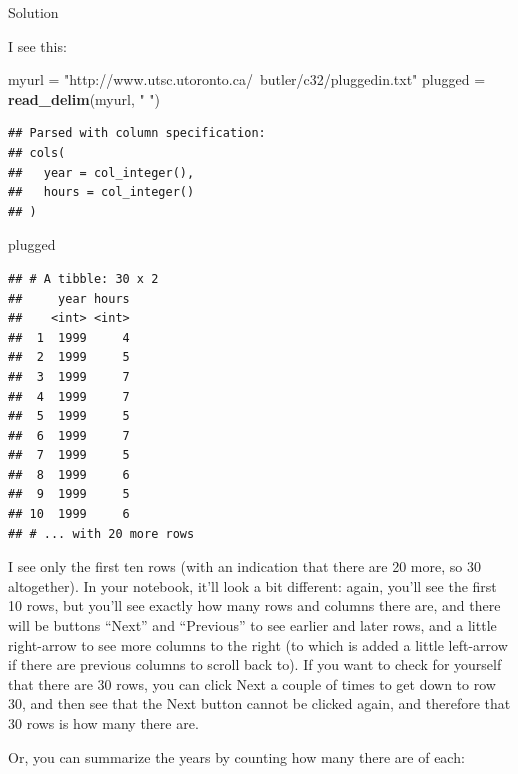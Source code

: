 \documentclass[]{tufte-book}
\newenvironment{Shaded}{}{}
\newcommand{\KeywordTok}[1]{\textcolor[rgb]{0.00,0.44,0.13}{\textbf{#1}}}
\newcommand{\NormalTok}[1]{#1}
\newcommand{\OperatorTok}[1]{\textcolor[rgb]{0.40,0.40,0.40}{#1}}
\newcommand{\StringTok}[1]{\textcolor[rgb]{0.25,0.44,0.63}{#1}}
\theoremstyle{definition}
\theoremstyle{definition}
\theoremstyle{definition}
\theoremstyle{remark}
\begin{document}
Solution

I see this:

\begin{Shaded}
\begin{Highlighting}[]
\NormalTok{myurl =}\StringTok{ "http://www.utsc.utoronto.ca/~butler/c32/pluggedin.txt"}
\NormalTok{plugged =}\StringTok{ }\KeywordTok{read_delim}\NormalTok{(myurl, }\StringTok{" "}\NormalTok{)}
\end{Highlighting}
\end{Shaded}

\begin{verbatim}
## Parsed with column specification:
## cols(
##   year = col_integer(),
##   hours = col_integer()
## )
\end{verbatim}

\begin{Shaded}
\begin{Highlighting}[]
\NormalTok{plugged}
\end{Highlighting}
\end{Shaded}

\begin{verbatim}
## # A tibble: 30 x 2
##     year hours
##    <int> <int>
##  1  1999     4
##  2  1999     5
##  3  1999     7
##  4  1999     7
##  5  1999     5
##  6  1999     7
##  7  1999     5
##  8  1999     6
##  9  1999     5
## 10  1999     6
## # ... with 20 more rows
\end{verbatim}

I see only the first ten rows (with an indication that there are 20
more, so 30 altogether). In your notebook, it'll look a bit different:
again, you'll see the first 10 rows, but you'll see exactly how many
rows and columns there are, and there will be buttons ``Next'' and
``Previous'' to see earlier and later rows, and a little right-arrow to
see more columns to the right (to which is added a little left-arrow if
there are previous columns to scroll back to). If you want to check for
yourself that there are 30 rows, you can click Next a couple of times to
get down to row 30, and then see that the Next button cannot be clicked
again, and therefore that 30 rows is how many there are.

Or, you can summarize the years by counting how many there are of each:

\begin{Shaded}
\end{Shaded}
\end{document}
